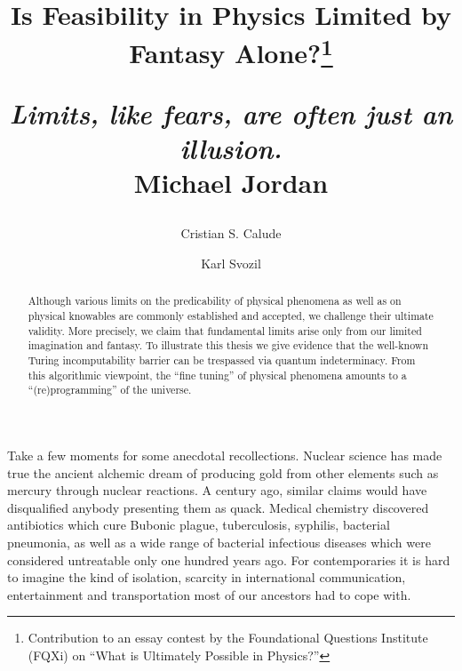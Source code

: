 \documentclass[11pt, pra,amsfonts,showpacs,showkeys]{revtex4}%
\begin{document}


\title{Is Feasibility in Physics Limited by Fantasy Alone?\footnote{Contribution to an essay contest by the Foundational Questions Institute (FQXi) on ``What is Ultimately Possible in Physics?''}

\medskip

\hfill{\it{\small  Limits, like fears, are often just an illusion.}}\\[-1ex]
\hfill{\rm {\small  Michael Jordan}}}

\author{Cristian S. Calude}

\author{Karl Svozil}

\begin{abstract}
Although various limits on the predicability of physical phenomena as well as on physical knowables are commonly established and accepted, we challenge their ultimate validity. More precisely, we claim that fundamental limits arise only from our limited imagination and fantasy. To illustrate this thesis we
give evidence that the well-known Turing incomputability barrier can be trespassed via quantum indeterminacy.
From this algorithmic viewpoint, the  ``fine tuning'' of physical phenomena amounts to a ``(re)programming'' of the universe.\end{abstract}


\maketitle

Take a few moments for some anecdotal recollections.
Nuclear science has made true the ancient alchemic dream of producing
gold from other elements such as mercury through nuclear reactions.
A century ago, similar claims would have disqualified anybody presenting them as quack.
Medical chemistry discovered antibiotics which cure Bubonic plague, tuberculosis, syphilis, bacterial pneumonia,
as well as a wide range of bacterial infectious diseases
which were considered untreatable only one hundred years ago.
For  contemporaries it is hard to imagine the kind of isolation, scarcity in international communication,
entertainment and transportation most of our ancestors had to cope with.
\end{document}
